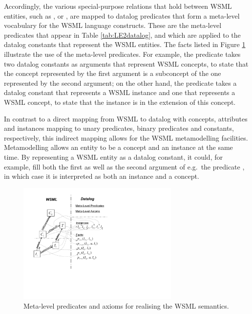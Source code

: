 Accordingly, the various special-purpose relations that hold
between WSML entities, such as ,
 or , are mapped to datalog
predicates that form a meta-level vocabulary for the WSML language
constructs. These are the meta-level predicates that appear in
Table \ref{tab:LE2datalog}, and which are applied to the datalog
constants that represent the WSML entities. The facts listed in
Figure \ref{fig:meta} illustrate the use of the meta-level
predicates. For example, the predicate \psco takes two datalog
constants as arguments that represent WSML concepts, to state that
the concept represented by the first argument is a subconcept of
the one represented by the second argument; on the other hand, the
predicate \pmo takes a datalog constant that represents a WSML
instance and one that represents a WSML concept, to state that the
instance is in the extension of this concept.

In contrast to a direct mapping from WSML to datalog with
concepts, attributes and instances mapping to unary predicates,
binary predicates and constants, respectively, this indirect
mapping allows for the WSML metamodelling facilities.
Metamodelling allows an entity to be a concept and an instance at
the same time. By representing a WSML entity as a datalog
constant, it could, for example, fill both the first as well as
the second argument of e.g.\ the predicate \pmo, in which case it
is interpreted as both an instance and a concept.

\begin{figure}[tb]
        \includegraphics[width=8cm]{figures/meta}
        \centering
    \caption{Meta-level predicates and axioms for realising the WSML semantics. \label{fig:meta}}
\end{figure}

